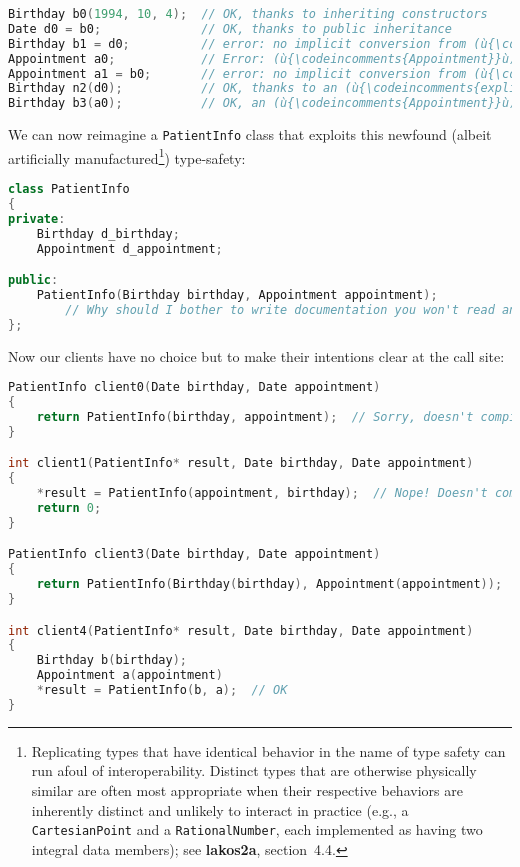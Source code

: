 \begin{lstlisting}[language=C++]
Birthday b0(1994, 10, 4);  // OK, thanks to inheriting constructors
Date d0 = b0;              // OK, thanks to public inheritance
Birthday b1 = d0;          // error: no implicit conversion from (ù{\codeincomments{Date}}ù)
Appointment a0;            // Error: (ù{\codeincomments{Appointment}}ù) has no default ctor.
Appointment a1 = b0;       // error: no implicit conversion from (ù{\codeincomments{Birthday}}ù)
Birthday n2(d0);           // OK, thanks to an (ù{\codeincomments{explicit}}ù) constructor in (ù{\codeincomments{Birthday}}ù)
Birthday b3(a0);           // OK, an (ù{\codeincomments{Appointment}}ù) (unfortunately) is a (ù{\codeincomments{Date}}ù).
\end{lstlisting}

\noindent We can now reimagine a \texttt{PatientInfo} class that exploits this
newfound (albeit artificially manufactured{\cprotect\footnote{Replicating
types that have identical behavior in the name of type safety can run
afoul of interoperability. Distinct types that are otherwise
physically similar are often most appropriate when their respective
behaviors are inherently distinct and unlikely to interact in practice
(e.g., a \mbox{\texttt{CartesianPoint}} and a \mbox{\texttt{RationalNumber}},
each implemented as having two integral data members); see
  \textbf{{lakos2a}}, section~4.4.}}) type-safety:

\begin{lstlisting}[language=C++]
class PatientInfo
{
private:
    Birthday d_birthday;
    Appointment d_appointment;

public:
    PatientInfo(Birthday birthday, Appointment appointment);
        // Why should I bother to write documentation you won't read anyway!?
};
\end{lstlisting}

\noindent Now our clients have no choice but to make their intentions clear at the
call site:

\begin{lstlisting}[language=C++]
PatientInfo client0(Date birthday, Date appointment)
{
    return PatientInfo(birthday, appointment);  // Sorry, doesn't compile.
}

int client1(PatientInfo* result, Date birthday, Date appointment)
{
    *result = PatientInfo(appointment, birthday);  // Nope! Doesn't compile.
    return 0;
}

PatientInfo client3(Date birthday, Date appointment)
{
    return PatientInfo(Birthday(birthday), Appointment(appointment));  // OK
}

int client4(PatientInfo* result, Date birthday, Date appointment)
{
    Birthday b(birthday);
    Appointment a(appointment)
    *result = PatientInfo(b, a);  // OK
}
\end{lstlisting}

